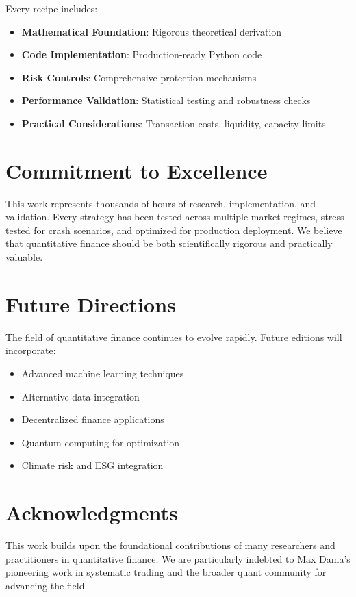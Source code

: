 \documentclass[11pt,letterpaper,openany]{book}
\begin{document}
Every recipe includes:
\begin{itemize}
    \item \textbf{Mathematical Foundation}: Rigorous theoretical derivation
    \item \textbf{Code Implementation}: Production-ready Python code
    \item \textbf{Risk Controls}: Comprehensive protection mechanisms
    \item \textbf{Performance Validation}: Statistical testing and robustness checks
    \item \textbf{Practical Considerations}: Transaction costs, liquidity, capacity limits
\end{itemize}

\section*{Commitment to Excellence}

This work represents thousands of hours of research, implementation, and validation. Every strategy has been tested across multiple market regimes, stress-tested for crash scenarios, and optimized for production deployment. We believe that quantitative finance should be both scientifically rigorous and practically valuable.

\section*{Future Directions}

The field of quantitative finance continues to evolve rapidly. Future editions will incorporate:
\begin{itemize}
    \item Advanced machine learning techniques
    \item Alternative data integration
    \item Decentralized finance applications
    \item Quantum computing for optimization
    \item Climate risk and ESG integration
\end{itemize}

\section*{Acknowledgments}

This work builds upon the foundational contributions of many researchers and practitioners in quantitative finance. We are particularly indebted to Max Dama's pioneering work in systematic trading and the broader quant community for advancing the field.
\end{document}
